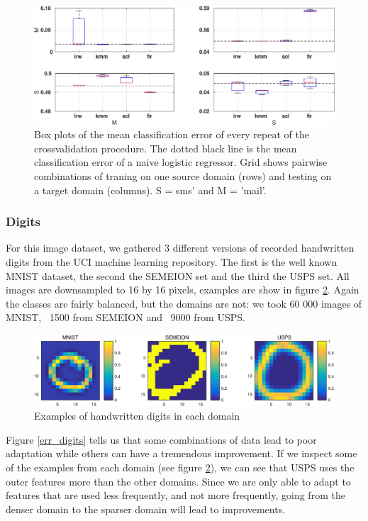 \documentclass[twoside,11pt]{article}
\begin{document}
\begin{figure}[ht]
	\centering
	\includegraphics[width=1\textwidth]{images/err_spam_box.eps}
	\caption{Box plots of the mean classification error of every repeat of the crossvalidation procedure. The dotted black line is the mean classification error of a naive logistic regressor. Grid shows pairwise combinations of traning on one source domain (rows) and testing on a target domain (columns). S = sms' and M = 'mail'.}
	\label{err_spam}
\end{figure}

\subsubsection{Digits}
For this image dataset, we gathered 3 different versions of recorded handwritten digits from the UCI machine learning repository. The first is the well known MNIST dataset, the second the SEMEION set and the third the USPS set. All images are downsampled to 16 by 16 pixels, examples are show in figure \ref{eg_digits}. Again the classes are fairly balanced, but the domains are not: we took 60 000 images of MNIST, ~1500 from SEMEION and ~9000 from USPS. 

\begin{figure}[ht]
	\centering
	\includegraphics[width=1\textwidth]{images/digits_examples.eps}
	\caption{Examples of handwritten digits in each domain}
	\label{eg_digits}
\end{figure}

Figure \ref{err_digits} tells us that some combinations of data lead to poor adaptation while others can have a tremendous improvement. If we inspect some of the examples from each domain (see figure \ref{eg_digits}), we can see that USPS uses the outer features more than the other domains. Since we are only able to adapt to features that are used less frequently, and not more frequently, going from the denser domain to the sparser domain will lead to improvements. 
\end{document}
